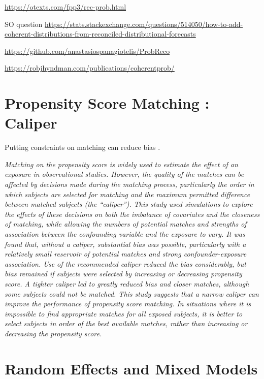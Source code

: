 \documentclass[
  11pt,
]{book}
\begin{document}
\url{https://otexts.com/fpp3/rec-prob.html}

SO question
\url{https://stats.stackexchange.com/questions/514050/how-to-add-coherent-distributions-from-reconciled-distributional-forecasts}

\url{https://github.com/anastasiospanagiotelis/ProbReco}

\url{https://robjhyndman.com/publications/coherentprob/}

\hypertarget{propensity-score-matching-caliper}{%
\chapter{Propensity Score Matching : Caliper}\label{propensity-score-matching-caliper}}

Putting constraints on matching can reduce bias \citep{10.1093/aje/kwt212}.

\emph{Matching on the propensity score is widely used to estimate the effect of an exposure in observational studies. However, the quality of the matches can be affected by decisions made during the matching process, particularly the order in which subjects are selected for matching and the maximum permitted difference between matched subjects (the ``caliper''). This study used simulations to explore the effects of these decisions on both the imbalance of covariates and the closeness of matching, while allowing the numbers of potential matches and strengths of association between the confounding variable and the exposure to vary. It was found that, without a caliper, substantial bias was possible, particularly with a relatively small reservoir of potential matches and strong confounder-exposure association. Use of the recommended caliper reduced the bias considerably, but bias remained if subjects were selected by increasing or decreasing propensity score. A tighter caliper led to greatly reduced bias and closer matches, although some subjects could not be matched. This study suggests that a narrow caliper can improve the performance of propensity score matching. In situations where it is impossible to find appropriate matches for all exposed subjects, it is better to select subjects in order of the best available matches, rather than increasing or decreasing the propensity score.}

\hypertarget{random-effects-and-mixed-models}{%
\chapter{Random Effects and Mixed Models}\label{random-effects-and-mixed-models}}
\end{document}
